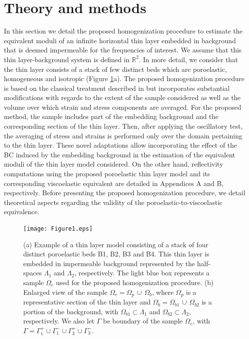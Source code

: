 \documentclass[draft]{agujournal2019}
\begin{document}
\section{Theory and methods}
In this section we detail the proposed homogenization procedure to estimate the equivalent moduli of an infinite horizontal thin layer embedded in background that is deemed impermeable for the frequencies of interest. We assume that this thin layer-background system is defined in $\mathbb R^2$. 
In more detail, we consider that the thin layer consists of a stack of few distinct beds which are poroelastic, homogeneous and isotropic (Figure \ref{fig.1}a). 
The proposed homogenization procedure is based on the classical treatment described in  but incorporates substantial modifications with regards to
the extent of the sample considered as well as the volume over which strain and stress components are averaged. For the proposed method, the sample includes part of the embedding background and the corresponding section of the thin layer. Then, after applying the oscillatory test, the averaging of stress and strains is performed only over the domain pertaining to the thin layer.
These novel adaptations allow
incorporating the effect of the BC induced by the embedding background in the estimation of the equivalent moduli of the thin layer model considered. 
On the other hand, reflectivity computations using the proposed poroelastic thin layer model  and its corresponding viscoelastic equivalent are detailed in Appendices A and B, respectively. Before presenting the proposed homogenization procedure,
we detail theoretical aspects regarding the validity of the poroelastic-to-viscoelastic equivalence.

\begin{figure}[!ht]
\centering
        \texttt{[image: Figure1.eps]}
\caption{ (a) Example of a thin layer model consisting of a stack of four distinct poroelastic beds B1, B2, B3 and B4. This thin layer is embedded in impermeable background represented by the half-spaces $\Lambda_1$ and $\Lambda_2$, respectively. The light blue box represents a sample $\Omega_e$ used for the proposed homogenization procedure. (b) Enlarged view of the sample $\Omega_e = \Omega_p \, \cup \, \Omega_b$, where  $\Omega_p$ is a representative section of the thin layer and  $\Omega_b= \Omega_{b1}  \, \cup \, \Omega_{b2}$ is a portion of the background, with $\Omega_{b1} \subset \Lambda_1$ and $\Omega_{b2} \subset \Lambda_2$, respectively. We also let $\Gamma$ be boundary of the  sample $\Omega_e$, with  $\Gamma = \Gamma_1^+ \cup \Gamma_1^- \cup \Gamma_3^+ \cup \Gamma_3^-$.
}
\label{fig.1}
\end{figure}
\end{document}
